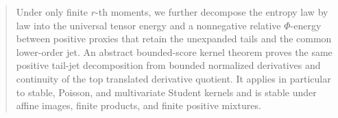 \documentclass[11pt,reqno]{amsart}
\theoremstyle{plain}
\theoremstyle{definition}
\numberwithin{equation}{section}
\begin{document}
\begin{abstract}
Under only finite \(r\)-th moments, we further decompose the entropy
law by law into the universal tensor energy and a nonnegative relative
\(\Phi\)-energy between positive proxies that retain the unexpanded tails and
the common lower-order jet.  An abstract bounded-score kernel theorem proves
the same positive tail-jet decomposition from bounded normalized derivatives
and continuity of the top translated derivative quotient.  It applies in
particular to stable, Poisson, and multivariate Student kernels and is stable
under affine images, finite products, and finite positive mixtures.
\end{abstract}
\maketitle






\appendix



\end{document}
